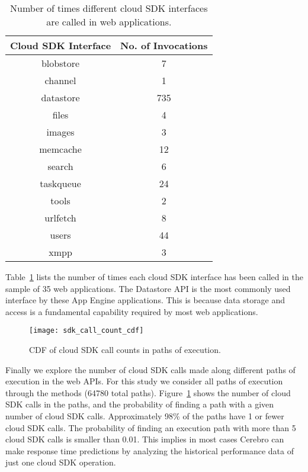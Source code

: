 \begin{table}[htdp]
\caption{Number of times different cloud SDK interfaces are called in web applications.}
\begin{center}
\begin{tabular}{|c|c|}
\hline
Cloud SDK Interface & No. of Invocations \\ \hline
blobstore & 7 \\ \hline
channel & 1 \\ \hline
datastore & 735 \\ \hline
files & 4 \\ \hline
images & 3 \\ \hline
memcache & 12 \\ \hline
search & 6 \\ \hline
taskqueue & 24 \\ \hline
tools & 2 \\ \hline
urlfetch & 8 \\ \hline
users & 44 \\ \hline
xmpp & 3 \\ \hline
\end{tabular}
\end{center}
\label{tab:sdk_call_counts}
\end{table}

Table~\ref{tab:sdk_call_counts} lists the number of times each cloud SDK interface has been called in the sample of
35 web applications. The Datastore API is the most commonly used interface 
by these App Engine applications.
This is because data storage and access is a fundamental 
capability required by most web applications. 

\begin{figure}
\centering
\texttt{[image: sdk\_call\_count\_cdf]}
\caption{CDF of cloud SDK call counts in paths of execution.}
\label{fig:sdk_call_count_cdf}
\end{figure}

Finally we explore the number of cloud SDK calls made along 
different paths of execution in the web APIs. For this study
we consider all paths of execution through the methods (64780 total paths). 
Figure~\ref{fig:sdk_call_count_cdf}
shows the number of cloud SDK calls in the paths, 
and the probability of finding a path with a given number of cloud SDK calls.
Approximately 98\% of the paths have 1 or fewer cloud SDK calls. 
The probability of finding an execution path with more than
5 cloud SDK calls is smaller than 0.01. 
This implies in most cases Cerebro can make response 
time predictions by analyzing the
historical performance data of just one cloud SDK operation.
